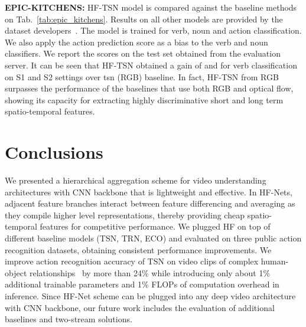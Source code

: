\documentclass[journal,onecolumn]{IEEEtran}
\begin{document}
{\noindent\textbf{EPIC-KITCHENS:}} HF-TSN model is compared against the baseline methods on Tab.~\ref{tab:epic_kitchens}. Results on all other models are provided by the dataset developers~\cite{damen2018scaling}. The model is trained for verb, noun and action classification. We also apply the action prediction score as a bias to the verb and noun classifiers. We report the scores on the test set obtained from the evaluation server. It can be seen that HF-TSN obtained a gain of  and  for verb classification on S1 and S2 settings over \ac{tsn} (RGB) baseline. In fact, HF-TSN from RGB surpasses the performance of the baselines that use both RGB and optical flow, showing its capacity for extracting highly discriminative short and long term spatio-temporal features. 













\section{Conclusions}
\label{sec:conclusions}
We presented a hierarchical aggregation scheme for video understanding architectures with CNN backbone that is lightweight and effective. In HF-Nets, adjacent feature branches interact between feature differencing and averaging as they compile higher level representations, thereby providing cheap spatio-temporal features for competitive performance.
We plugged HF on top of different baseline models (TSN, TRN, ECO) and evaluated on three public action recognition datasets, obtaining consistent performance improvements. We improve action recognition accuracy of TSN on video clips of complex human-object relationships~\cite{goyal2017something} by more than 24\% while introducing only about 1\% additional trainable parameters and 1\% FLOPs of computation overhead in inference. 
Since HF-Net scheme can be plugged into any deep video architecture with CNN backbone, our future work includes the evaluation of additional baselines and two-stream solutions. 








\end{document}
